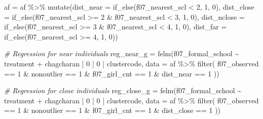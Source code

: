 \documentclass[
]{article}
\newenvironment{Shaded}{\begin{snugshade}}{\end{snugshade}}
\newcommand{\AttributeTok}[1]{\textcolor[rgb]{0.77,0.63,0.00}{#1}}
\newcommand{\CommentTok}[1]{\textcolor[rgb]{0.56,0.35,0.01}{\textit{#1}}}
\newcommand{\DecValTok}[1]{\textcolor[rgb]{0.00,0.00,0.81}{#1}}
\newcommand{\FunctionTok}[1]{\textcolor[rgb]{0.00,0.00,0.00}{#1}}
\newcommand{\NormalTok}[1]{#1}
\newcommand{\OtherTok}[1]{\textcolor[rgb]{0.56,0.35,0.01}{#1}}
\newcommand{\SpecialCharTok}[1]{\textcolor[rgb]{0.00,0.00,0.00}{#1}}
\begin{document}
\begin{Shaded}
\begin{Highlighting}[]
\NormalTok{af }\OtherTok{=}\NormalTok{ af }\SpecialCharTok{\%\textgreater{}\%} \FunctionTok{mutate}\NormalTok{(}\AttributeTok{dist\_near =} \FunctionTok{if\_else}\NormalTok{(f07\_nearest\_scl }\SpecialCharTok{\textless{}} \DecValTok{2}\NormalTok{, }\DecValTok{1}\NormalTok{, }\DecValTok{0}\NormalTok{),}
               \AttributeTok{dist\_close =} \FunctionTok{if\_else}\NormalTok{(f07\_nearest\_scl }\SpecialCharTok{\textgreater{}=} \DecValTok{2} \SpecialCharTok{\&}\NormalTok{ f07\_nearest\_scl }\SpecialCharTok{\textless{}} \DecValTok{3}\NormalTok{, }\DecValTok{1}\NormalTok{, }\DecValTok{0}\NormalTok{),}
               \AttributeTok{dist\_nclose =} \FunctionTok{if\_else}\NormalTok{(f07\_nearest\_scl }\SpecialCharTok{\textgreater{}=} \DecValTok{3} \SpecialCharTok{\&}\NormalTok{ f07\_nearest\_scl }\SpecialCharTok{\textless{}} \DecValTok{4}\NormalTok{, }\DecValTok{1}\NormalTok{, }\DecValTok{0}\NormalTok{),}
               \AttributeTok{dist\_far =} \FunctionTok{if\_else}\NormalTok{(f07\_nearest\_scl }\SpecialCharTok{\textgreater{}=} \DecValTok{4}\NormalTok{, }\DecValTok{1}\NormalTok{, }\DecValTok{0}\NormalTok{))}

\CommentTok{\# Regression for near individuals}
\NormalTok{reg\_near\_g }\OtherTok{=} \FunctionTok{felm}\NormalTok{(f07\_formal\_school }\SpecialCharTok{\textasciitilde{}}\NormalTok{ treatment }\SpecialCharTok{+} 
\NormalTok{                   chagcharan }\SpecialCharTok{|} \DecValTok{0} \SpecialCharTok{|} \DecValTok{0} \SpecialCharTok{|}\NormalTok{ clustercode,}
         \AttributeTok{data =}\NormalTok{ af }\SpecialCharTok{\%\textgreater{}\%} \FunctionTok{filter}\NormalTok{( }
\NormalTok{                              f07\_observed }\SpecialCharTok{==} \DecValTok{1} \SpecialCharTok{\&}
\NormalTok{                              nonoutlier }\SpecialCharTok{==} \DecValTok{1} \SpecialCharTok{\&}
\NormalTok{                              f07\_girl\_cnt }\SpecialCharTok{==} \DecValTok{1} \SpecialCharTok{\&}
\NormalTok{                              dist\_near }\SpecialCharTok{==} \DecValTok{1}
\NormalTok{                              ))}

\CommentTok{\# Regression for close individuals}
\NormalTok{reg\_close\_g }\OtherTok{=} \FunctionTok{felm}\NormalTok{(f07\_formal\_school }\SpecialCharTok{\textasciitilde{}}\NormalTok{ treatment }\SpecialCharTok{+} 
\NormalTok{                   chagcharan }\SpecialCharTok{|} \DecValTok{0} \SpecialCharTok{|} \DecValTok{0} \SpecialCharTok{|}\NormalTok{ clustercode,}
         \AttributeTok{data =}\NormalTok{ af }\SpecialCharTok{\%\textgreater{}\%} \FunctionTok{filter}\NormalTok{( }
\NormalTok{                              f07\_observed }\SpecialCharTok{==} \DecValTok{1} \SpecialCharTok{\&}
\NormalTok{                              nonoutlier }\SpecialCharTok{==} \DecValTok{1} \SpecialCharTok{\&}
\NormalTok{                              f07\_girl\_cnt }\SpecialCharTok{==} \DecValTok{1} \SpecialCharTok{\&}
\NormalTok{                              dist\_close }\SpecialCharTok{==} \DecValTok{1}
\NormalTok{                              ))}


\end{Highlighting}
\end{Shaded}
\end{document}
